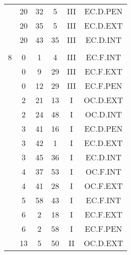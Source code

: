 \documentclass[12pt, a4paper]{article}
\begin{document}
\begin{multicols}{3}
{\begin{tabular}{c c c c c c}
	 	 	 	 & 20 & 32 & 5 & III & EC.D.PEN\\%
	 	 	 	 & 20 & 35 & 5 & III & EC.D.EXT\\%
	 	 	 	 & 20 & 43 & 35 & III & EC.D.INT\\%
	 	 	 	 & & & & & \\%
	 	 	 	8 & 0 & 1 & 4 & III & EC.F.INT\\%
	 	 	 	 & 0 & 9 & 29 & III & EC.F.EXT\\%
	 	 	 	 & 0 & 12 & 29 & III & EC.F.PEN\\%
	 	 	 	 & 2 & 21 & 13 & I & OC.D.EXT\\%
	 	 	 	 & 2 & 24 & 48 & I & OC.D.INT\\%
	 	 	 	 & 3 & 41 & 16 & I & EC.D.PEN\\%
	 	 	 	 & 3 & 42 & 1 & I & EC.D.EXT\\%
	 	 	 	 & 3 & 45 & 36 & I & EC.D.INT\\%
	 	 	 	 & 4 & 37 & 53 & I & OC.F.INT\\%
	 	 	 	 & 4 & 41 & 28 & I & OC.F.EXT\\%
	 	 	 	 & 5 & 58 & 43 & I & EC.F.INT\\%
	 	 	 	 & 6 & 2 & 18 & I & EC.F.EXT\\%
	 	 	 	 & 6 & 2 & 58 & I & EC.F.PEN\\%
	 	 	 	 & 13 & 5 & 50 & II & OC.D.EXT\\%
	 	 \end{tabular}
 	}
\end{multicols}
\end{document}
